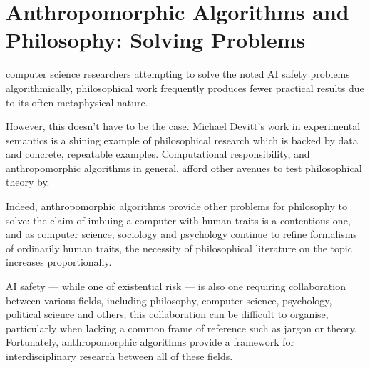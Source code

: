 \section{Anthropomorphic Algorithms and Philosophy: Solving Problems}

 computer science researchers attempting to solve the noted AI safety problems algorithmically, philosophical work frequently produces fewer practical results due to its often metaphysical nature.\par

However, this doesn't have to be the case. Michael Devitt's work in experimental semantics\cite{experimental_semantics} is a shining example of philosophical research which is backed by data and concrete, repeatable examples. Computational responsibility, and anthropomorphic algorithms in general, afford other avenues to test philosophical theory by.\par

Indeed, anthropomorphic algorithms provide other problems for philosophy to solve: the claim of imbuing a computer with human traits is a contentious one, and as computer science, sociology and psychology continue to refine formalisms of ordinarily human traits, the necessity of philosophical literature on the topic increases proportionally.\par
 AI safety --- while one of existential risk --- is also one requiring collaboration between various fields, including philosophy, computer science, psychology, political science and others; this collaboration can be difficult to organise, particularly when lacking a common frame of reference such as jargon or theory. Fortunately, anthropomorphic algorithms provide a framework for interdisciplinary research between all of these fields.\par


